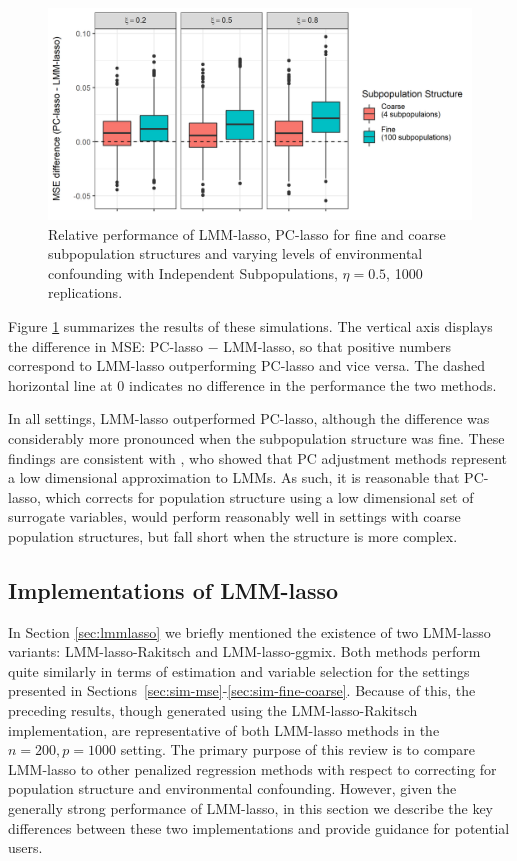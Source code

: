 \begin{figure}[H]
    \centering
    \includegraphics[scale = 0.9]{figures/mse_diff_subpops.png}
    \caption{Relative performance of LMM-lasso, PC-lasso for fine and coarse subpopulation structures and varying levels of environmental confounding with Independent Subpopulations, $\eta = 0.5$, 1000 replications.}
    \label{fig:big_vs_small}
\end{figure}

Figure \ref{fig:big_vs_small} summarizes the results of these simulations. The vertical axis displays the difference in MSE: PC-lasso $-$ LMM-lasso, so that positive numbers correspond to LMM-lasso outperforming PC-lasso and vice versa. The dashed horizontal line at 0 indicates no difference in the performance the two methods.

In all settings, LMM-lasso outperformed PC-lasso, although the difference was considerably more pronounced when the subpopulation structure was fine.  These findings are consistent with \citet{hoffman2013correcting}, who showed that PC adjustment methods represent a low dimensional approximation to LMMs. As such, it is reasonable that PC-lasso, which corrects for population structure using a low dimensional set of surrogate variables, would perform reasonably well in settings with coarse population structures, but fall short when the structure is more complex.

\subsection{Implementations of LMM-lasso}

In Section \ref{sec:lmmlasso} we briefly mentioned the existence of two LMM-lasso variants: LMM-lasso-Rakitsch and LMM-lasso-ggmix. Both methods perform quite similarly in terms of estimation and variable selection for the settings presented in Sections~\ref{sec:sim-mse}-\ref{sec:sim-fine-coarse}. Because of this, the preceding results, though generated using the LMM-lasso-Rakitsch implementation, are representative of both LMM-lasso methods in the $n = 200, p = 1000$ setting. The primary purpose of this review is to compare LMM-lasso to other penalized regression methods with respect to correcting for population structure and environmental confounding. However, given the generally strong performance of LMM-lasso, in this section we describe the key differences between these two implementations and provide guidance for potential users.

